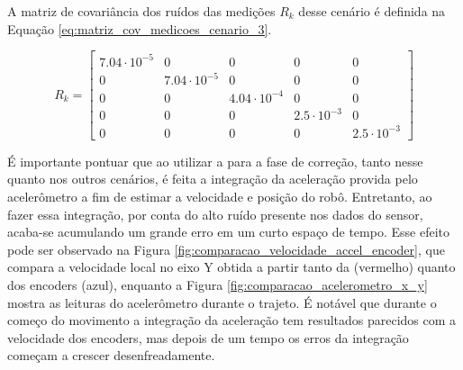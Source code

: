 \documentclass[acronym, symbols, table]{fei}
\begin{document}
			A matriz de covariância dos ruídos das medições $R_{k}$ desse cenário é definida na Equação \eqref{eq:matriz_cov_medicoes_cenario_3}.
			
			\begin{equation}\label{eq:matriz_cov_medicoes_cenario_3}
				R_{k} = \begin{bmatrix}
					7.04\cdot10^{-5} & 0 & 0 & 0 & 0 \\
					0 & 7.04\cdot10^{-5} & 0 & 0 & 0 \\
					0 & 0 & 4.04\cdot10^{-4} & 0 & 0 \\
					0 & 0 & 0 & 2.5\cdot10^{-3} & 0 \\
					0 & 0 & 0 & 0 & 2.5\cdot10^{-3}
				\end{bmatrix}
			\end{equation}
		
			É importante pontuar que ao utilizar a  para a fase de correção, tanto nesse quanto nos outros cenários, é feita a integração da aceleração provida pelo acelerômetro a fim de estimar a velocidade e posição do robô. Entretanto, ao fazer essa integração, por conta do alto ruído presente nos dados do sensor, acaba-se acumulando um grande erro em um curto espaço de tempo. Esse efeito pode ser observado na Figura \ref{fig:comparacao_velocidade_accel_encoder}, que compara a velocidade local no eixo Y obtida a partir tanto da  (vermelho) quanto dos encoders (azul), enquanto a Figura \ref{fig:comparacao_acelerometro_x_y} mostra as leituras do acelerômetro durante o trajeto. É notável que durante o começo do movimento a integração da aceleração tem resultados parecidos com a velocidade dos encoders, mas depois de um tempo os erros da integração começam a crescer desenfreadamente.
			
\end{document}
